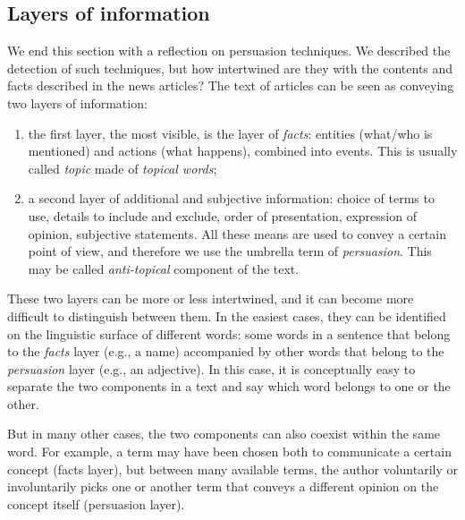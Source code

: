 \subsection{\statusgreen Layers of information}
\label{ssec:lit_layers_of_info}
We end this section with a reflection on persuasion techniques.
We described the detection of such techniques, but how intertwined are they with the contents and facts described in the news articles?
The text of articles can be seen as conveying two layers of information:
\begin{enumerate}
    \item the first layer, the most visible, is the layer of \emph{facts}: entities (what/who is mentioned) and actions (what happens), combined into events. This is usually called \emph{topic} made of \emph{topical words};
    \item a second layer of additional and subjective information: choice of terms to use, details to include and exclude, order of presentation, expression of opinion, subjective statements. All these means are used to convey a certain point of view, and therefore we use the umbrella term of \emph{persuasion}. This may be called \emph{anti-topical} component of the text.
\end{enumerate}



These two layers can be more or less intertwined, and it can become more difficult to distinguish between them.
In the easiest cases, they can be identified on the linguistic surface of different words: some words in a sentence that belong to the \emph{facts} layer (e.g., a name) accompanied by other words that belong to the \emph{persuasion} layer (e.g., an adjective).
In this case, it is conceptually easy to separate the two components in a text and say which word belongs to one or the other.

But in many other cases, the two components can also coexist within the same word. For example, a term may have been chosen both to communicate a certain concept (facts layer), but between many available terms, the author voluntarily or involuntarily picks one or another term that conveys a different opinion on the concept itself (persuasion layer).


